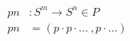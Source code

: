 \documentclass[preview]{standalone}
\begin{document}
\begin{align*}
  pn &: S^m \rightarrow S^n \in P\\
  pn &= (p \cdot p \cdot ...\ , p \cdot ...)
\end{align*}
\end{document}
